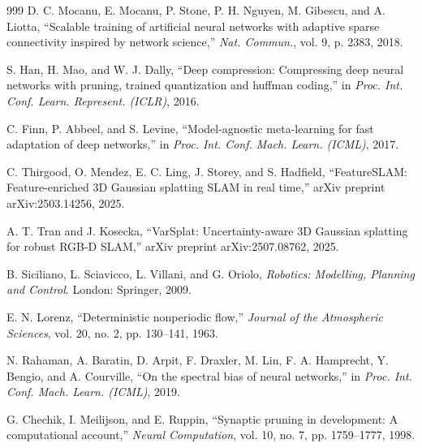 \documentclass[12pt,a4paper,oneside]{report}
\begin{document}
\begin{thebibliography}{999}
D. C. Mocanu, E. Mocanu, P. Stone, P. H. Nguyen, M. Gibescu, and A. Liotta, ``Scalable training of artificial neural networks with adaptive sparse connectivity inspired by network science,'' \textit{Nat. Commun.}, vol. 9, p. 2383, 2018.

S. Han, H. Mao, and W. J. Dally, ``Deep compression: Compressing deep neural networks with pruning, trained quantization and huffman coding,'' in \textit{Proc. Int. Conf. Learn. Represent. (ICLR)}, 2016.

C. Finn, P. Abbeel, and S. Levine, ``Model-agnostic meta-learning for fast adaptation of deep networks,'' in \textit{Proc. Int. Conf. Mach. Learn. (ICML)}, 2017.

C. Thirgood, O. Mendez, E. C. Ling, J. Storey, and S. Hadfield, ``{FeatureSLAM}: Feature-enriched {3D} Gaussian splatting {SLAM} in real time,'' arXiv preprint arXiv:2503.14256, 2025.

A. T. Tran and J. Kosecka, ``{VarSplat}: Uncertainty-aware {3D} Gaussian splatting for robust {RGB-D} {SLAM},'' arXiv preprint arXiv:2507.08762, 2025.

B. Siciliano, L. Sciavicco, L. Villani, and G. Oriolo, \textit{Robotics: Modelling, Planning and Control}. London: Springer, 2009.

E. N. Lorenz, ``Deterministic nonperiodic flow,'' \textit{Journal of the Atmospheric Sciences}, vol. 20, no. 2, pp. 130--141, 1963.

N. Rahaman, A. Baratin, D. Arpit, F. Draxler, M. Lin, F. A. Hamprecht, Y. Bengio, and A. Courville, ``On the spectral bias of neural networks,'' in \textit{Proc. Int. Conf. Mach. Learn. (ICML)}, 2019.

G. Chechik, I. Meilijson, and E. Ruppin, ``Synaptic pruning in development: A computational account,'' \textit{Neural Computation}, vol. 10, no. 7, pp. 1759--1777, 1998.

\end{thebibliography}
\end{document}
